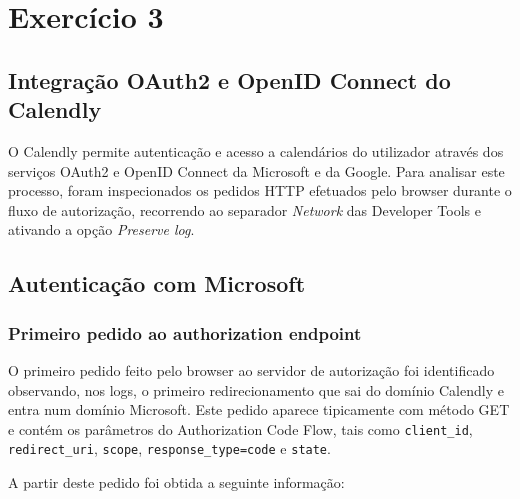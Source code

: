 \chapter{Exercício 3}
\label{cha:exercise_3}

\section{Integração OAuth2 e OpenID Connect do Calendly}

O Calendly permite autenticação e acesso a calendários do utilizador através dos serviços OAuth2 e
OpenID Connect da Microsoft e da Google. Para analisar este processo, foram inspecionados os pedidos
HTTP efetuados pelo browser durante o fluxo de autorização, recorrendo ao separador \textit{Network} das
Developer Tools e ativando a opção \textit{Preserve log}.

\section{Autenticação com Microsoft}

\subsection*{Primeiro pedido ao authorization endpoint}

O primeiro pedido feito pelo browser ao servidor de autorização foi identificado observando, nos logs,
o primeiro redirecionamento que sai do domínio Calendly e entra num domínio Microsoft. Este pedido
aparece tipicamente com método GET e contém os parâmetros do Authorization Code Flow, tais como
\texttt{client\_id}, \texttt{redirect\_uri}, \texttt{scope}, \texttt{response\_type=code} e \texttt{state}.  

A partir deste pedido foi obtida a seguinte informação:

